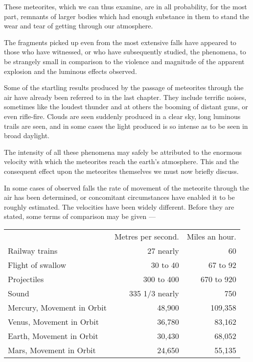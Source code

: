 \documentclass[a4paper, 12pt, oneside, polutonikogreek, english]{article}
\begin{document}
These meteorites, which we can thus examine, are in all probability, for the most part, remnants of larger bodies which had enough substance in them to stand the wear and tear of getting through our atmosphere.

The fragments picked up even from the most extensive falls have appeared to those who have witnessed, or who have subsequently studied, the phenomena, to be strangely small in comparison to the violence and magnitude of the apparent explosion and the luminous effects observed.

Some of the startling results produced by the passage of meteorites through the air have already been referred to in the last chapter. They include terrific noises, sometimes like the loudest thunder and at others the booming of distant guns, or even rifle-fire. Clouds are seen suddenly produced in a clear sky, long luminous trails are seen, and in some cases the light produced is so intense as to be seen in broad daylight.

The intensity of all these phenomena may safely be attributed to the enormous velocity with which the meteorites reach the earth's atmosphere. This and the consequent effect upon the meteorites themselves we must now briefly discuss.

In some cases of observed falls the rate of movement of the meteorite through the air has been determined, or concomitant circumstances have enabled it to be roughly estimated. The velocities have been widely different. Before they are stated, some terms of comparison may be given ---
\begin{table}[H]
    \centering
    \begin{tabular}{l r r}
        ~ & Metres per second. & Miles an hour. \\
        Railway trains & 27 nearly & 60 \\
        Flight of swallow & 30 to 40 & 67 to 92 \\
        Projectiles & 300 to 400 & 670 to 920 \\
        Sound & 335 1/3 nearly & 750 \\
        Mercury, Movement in Orbit & 48,900 & 109,358 \\
        Venus, Movement in Orbit & 36,780 & 83,162 \\
        Earth, Movement in Orbit & 30,430 & 68,052 \\
        Mars, Movement in Orbit & 24,650 & 55,135 \\
    \end{tabular}
\end{table}
\end{document}
